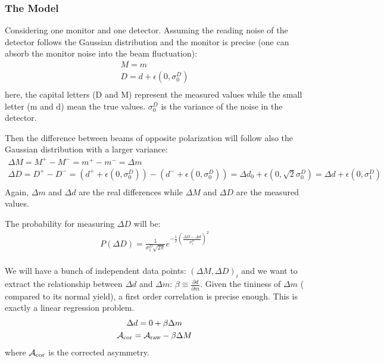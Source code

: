 \subsubsection{The Model}
Considering one monitor and one detector. Assuming the reading noise of the detector
follows the Gaussian distribution and the monitor is precise (one can absorb the monitor
noise into the beam fluctuation):
\begin{equation}
    \begin{gathered}
	M = m	\\
	D = d + \epsilon(0, \sigma_0^D)    \\
    \end{gathered}
\end{equation}
here, the capital letters (D and M) represent the measured values while the 
small letter (m and d) mean the true values. $\sigma_0^D$ 
is the variance of the noise in the detector.

Then the difference between beams of opposite polarization will follow also
the Gaussian distribution with a larger variance:
\begin{equation}
    \begin{gathered}
	\Delta M = M^+ - M^- = m^+ - m^- = \Delta m   \\
	\Delta D = D^+ - D^- = (d^+ + \epsilon(0, \sigma_0^D)) - (d^- + \epsilon(0, \sigma_0^D))
	    = \Delta d_0 + \epsilon(0, \sqrt{2}\sigma_0^D)
	    = \Delta d + \epsilon(0, \sigma_1^D) \\
    \end{gathered}
\end{equation}
Again, $\Delta m$ and $\Delta d$ are the real differences
while $\Delta M$ and $\Delta D$ are the measured values.

The probability for measuring $\Delta D$ will be:
\begin{equation}
    \begin{gathered}
	P(\Delta D) = \frac{1}{\sigma_1^D\sqrt{2\pi}} e^{-\frac{1}{2}\left( \frac{\Delta D - \Delta d}{\sigma_1^D}\right)^2}    \\
    \end{gathered}
\end{equation}

We will have a bunch of independent data points: $(\Delta M, \Delta D)_i$ and 
we want to extract the relationship between $\Delta d$ and $\Delta m$: 
$\beta \equiv \frac{\partial d}{\partial m}$. Given the tininess of $\Delta m$ (
compared to its normal yield), a first order correlation is precise enough. 
This is exactly a linear regression problem.
\begin{equation}
    \begin{gathered}
	\Delta d = 0 + \beta \Delta m	\\
	\mathcal{A}_{\text{cor}} = \mathcal{A}_{\text{raw}} - \beta\Delta M	\\
    \end{gathered}
    \label{eq:first_order_correlation}
\end{equation}
where $\mathcal{A}_{\text{cor}}$ is the corrected asymmetry.

